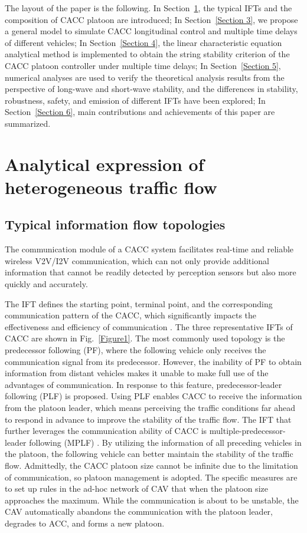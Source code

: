 \documentclass[journal]{IEEEtran}
\begin{document}
The layout of the paper is the following. In Section~\ref{Section 2}, the typical IFTs and the composition of CACC platoon are introduced; In Section~\ref{Section 3}, we propose a general model to simulate CACC longitudinal control and multiple time delays of different vehicles; In Section~\ref{Section 4}, the linear characteristic equation analytical method is implemented to obtain the string stability criterion of the CACC platoon controller under multiple time delays; In Section~\ref{Section 5}, numerical analyses are used to verify the theoretical analysis results from the perspective of long-wave and short-wave stability, and the differences in stability, robustness, safety, and emission of different IFTs have been explored; In Section~\ref{Section 6}, main contributions and achievements of this paper are summarized.

\section{Analytical expression of heterogeneous traffic flow}
\label{Section 2}
\subsection{Typical information flow topologies}
The communication module of a CACC system facilitates real-time and reliable wireless V2V/I2V communication, which can not only provide additional information that cannot be readily detected by perception sensors but also more quickly and accurately.


The IFT defines the starting point, terminal point, and the corresponding communication pattern of the CACC, which significantly impacts the effectiveness and efficiency of communication \citep{zheng2015stability}. The three representative IFTs of CACC are shown in Fig.~\ref{Figure1}. The most commonly used topology is the predecessor following (PF), where the following vehicle only receives the communication signal from its predecessor. However, the inability of PF to obtain information from distant vehicles makes it unable to make full use of the advantages of communication. In response to this feature, predecessor-leader following (PLF) is proposed. Using PLF enables CACC to receive the information from the platoon leader, which means perceiving the traffic conditions far ahead to respond in advance to improve the stability of the traffic flow. The IFT that further leverages the communication ability of CACC is multiple-predecessor-leader following (MPLF) \citep{jia2015survey,ma2020stability}. By utilizing the information of all preceding vehicles in the platoon, the following vehicle can better maintain the stability of the traffic flow. Admittedly, the CACC platoon size cannot be infinite due to the limitation of communication, so platoon management is adopted. The specific measures are to set up rules in the ad-hoc network of CAV that when the platoon size approaches the maximum. While the communication is about to be unstable, the CAV automatically abandons the communication with the platoon leader, degrades to ACC, and forms a new platoon.
\end{document}
